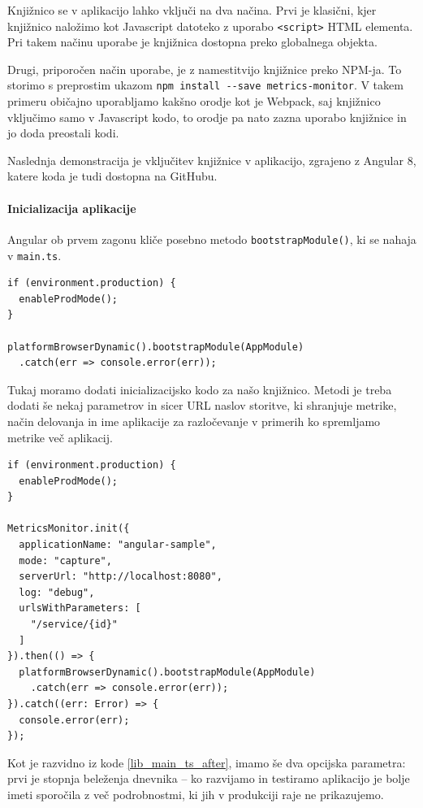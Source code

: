 \documentclass[a4paper, 12pt]{book}
\begin{document}
Knjižnico se v aplikacijo lahko vključi na dva načina. Prvi je klasični, kjer knjižnico naložimo kot Javascript datoteko z uporabo \verb|<script>| HTML elementa. Pri takem načinu uporabe je knjižnica dostopna preko globalnega objekta.

Drugi, priporočen način uporabe, je z namestitvijo knjižnice preko NPM-ja. To storimo s preprostim ukazom \verb|npm install --save metrics-monitor|. V takem primeru običajno uporabljamo kakšno orodje kot je Webpack, saj knjižnico vključimo samo v Javascript kodo, to orodje pa nato zazna uporabo knjižnice in jo doda preostali kodi.

Naslednja demonstracija je vključitev knjižnice v aplikacijo, zgrajeno z Angular 8, katere koda je tudi dostopna na GitHubu.

\paragraph{Inicializacija aplikacije} 
Angular ob prvem zagonu kliče posebno metodo \verb|bootstrapModule()|, ki se nahaja v \verb|main.ts|.

\begin{lstlisting}[label=lib_main_ts, caption=Zagon Angular aplikacije]
if (environment.production) {
  enableProdMode();
}

platformBrowserDynamic().bootstrapModule(AppModule)
  .catch(err => console.error(err));
\end{lstlisting}

Tukaj moramo dodati inicializacijsko kodo za našo knjižnico. Metodi je treba dodati še nekaj parametrov in sicer URL naslov storitve, ki shranjuje metrike, način delovanja in ime aplikacije za razločevanje v primerih ko spremljamo metrike več aplikacij. \\

\begin{lstlisting}[label=lib_main_ts_after, caption=Inicializacija knjižnice]
if (environment.production) {
  enableProdMode();
}

MetricsMonitor.init({
  applicationName: "angular-sample",
  mode: "capture",
  serverUrl: "http://localhost:8080",
  log: "debug",
  urlsWithParameters: [
    "/service/{id}"
  ]
}).then(() => {
  platformBrowserDynamic().bootstrapModule(AppModule)
    .catch(err => console.error(err));
}).catch((err: Error) => {
  console.error(err);
});
\end{lstlisting}

Kot je razvidno iz kode \ref{lib_main_ts_after}, imamo še dva opcijska parametra: prvi je stopnja beleženja dnevnika -- ko razvijamo in testiramo aplikacijo je bolje imeti sporočila z več podrobnostmi, ki jih v produkciji raje ne prikazujemo.
\end{document}
